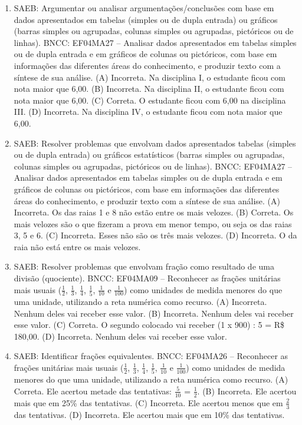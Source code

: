 \begin{enumerate}
\item
SAEB: Argumentar ou analisar argumentações/conclusões com
base em dados apresentados em tabelas (simples ou de dupla entrada) ou
gráficos (barras simples ou agrupadas, colunas simples ou agrupadas,
pictóricos ou de linhas).
BNCC: EF04MA27 -- Analisar dados apresentados em tabelas simples ou de dupla entrada e em gráficos de
colunas ou pictóricos, com base em informações das diferentes áreas do conhecimento, e produzir
texto com a síntese de sua análise.
(A) Incorreta. Na disciplina I, o estudante ficou com nota maior que 6,00.
(B) Incorreta. Na disciplina II, o estudante ficou com nota maior que 6,00.
(C) Correta. O estudante ficou com 6,00 na disciplina III.
(D) Incorreta. Na disciplina IV, o estudante ficou com nota maior que 6,00.

\item
SAEB: Resolver problemas que envolvam dados apresentados tabelas (simples ou
de dupla entrada) ou gráficos estatísticos (barras simples ou agrupadas,
colunas simples ou agrupadas, pictóricos ou de linhas).
BNCC: EF04MA27 -- Analisar dados apresentados em tabelas simples ou de dupla entrada e em gráficos de
colunas ou pictóricos, com base em informações das diferentes áreas do conhecimento, e produzir
texto com a síntese de sua análise.
(A) Incorreta. Os das raias 1 e 8 não estão entre os mais velozes.
(B) Correta. Os mais velozes são o que fizeram a prova em menor tempo, ou seja os das raias 3, 5 e 6.
(C) Incorreta. Esses não são os três mais velozes.
(D) Incorreta. O da raia não está entre os mais velozes.

\item
SAEB: Resolver problemas que envolvam fração como resultado
de uma divisão (quociente).
BNCC: EF04MA09 -- Reconhecer as frações unitárias mais usuais ($\frac{1}{2}$, $\frac{1}{3}$, $\frac{1}{4}$, $\frac{1}{5}$, $\frac{1}{10}$ e $\frac{1}{100}$) como
unidades de medida menores do que uma unidade, utilizando a reta numérica como recurso.
(A) Incorreta. Nenhum deles vai receber esse valor.
(B) Incorreta. Nenhum deles vai receber esse valor.
(C) Correta. O segundo colocado vai receber (1 x 900) : 5 = R\$ 180,00.
(D) Incorreta. Nenhum deles vai receber esse valor.

\item
SAEB: Identificar frações equivalentes.
BNCC: EF04MA26 -- Reconhecer as frações unitárias mais usuais ($\frac{1}{2}$, $\frac{1}{3}$, $\frac{1}{4}$, $\frac{1}{5}$, $\frac{1}{10}$ e $\frac{1}{100}$) como
unidades de medida menores do que uma unidade, utilizando a reta numérica como recurso.
(A) Correta. Ele acertou metade das tentativas: $\frac{5}{10}$ = $\frac{1}{2}$.
(B) Incorreta. Ele acertou mais que em 25\% das tentativas.
(C) Incorreta. Ele acertou menos que em $\frac{2}{3}$ das tentativas.
(D) Incorreta. Ele acertou mais que em 10\% das tentativas.


\end{enumerate}
